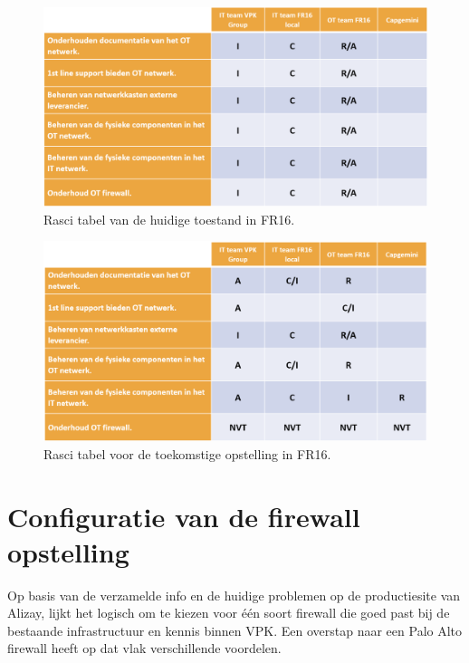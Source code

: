 \begin{figure}[H]
    \centering
    \includegraphics[width=1\textwidth]{fotos/Rasci_AS-IS.png}
    \caption[Foto Rasci AS-IS]{\label{fig:grail}Rasci tabel van de huidige toestand in FR16.}
\end{figure} 

\begin{figure}[H]
    \centering
    \includegraphics[width=1\textwidth]{fotos/Rasci_TO-BE.png}
    \caption[Foto Rasci TO-BE]{\label{fig:grail}Rasci tabel voor de toekomstige opstelling in FR16.}
\end{figure} 



\chapter{Configuratie van de firewall opstelling}
\label{ch:configFW}

Op basis van de verzamelde info en de huidige problemen op de productiesite van Alizay, lijkt het logisch om te kiezen voor één soort firewall die goed past bij de bestaande infrastructuur en kennis binnen VPK. Een overstap naar een Palo Alto firewall heeft op dat vlak verschillende voordelen.

